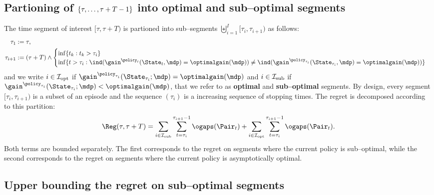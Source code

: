 \documentclass[preprint,cleveref,12pt]{colt2025}
\DeclarePairedDelimiter{\braces}{\{}{\}}	%
\DeclarePairedDelimiter{\parens}{(}{)}	%
\newcommand{\indic}[1]{\ind\parens{#1}}
\def\indicator{\indic}
\def\model{\mdp}
\def\optgain{\optimalgain} %
\newcommand{\strong}[1]{\textbf{#1}}
\begin{document}
    \subsection{Partioning of $\braces{\tau, \ldots, \tau+T-1}$ into optimal and sub--optimal segments}
    \label{appendix_coherence_partioning}

    The time segment of interest $[\tau, \tau+T)$ is partioned into sub--segments $\biguplus_{i=1}^I [\tau_i, \tau_{i+1})$ as follows:
        \vspace{-1em}
    \begin{equation}
    \notag
    \begin{split}
        \tau_1 & := \tau, 
        \\
        \tau_{i+1} & := 
        (\tau + T) 
        \wedge 
        \begin{cases}
            \inf \braces{t_k: t_k > \tau_i} 
            \\
            \inf \braces{t > \tau_i: \indicator{\gain^{\policy_t}(\State_t, \model) = \optgain(\model)} \ne \indicator{\gain^{\policy_{\tau_i}}(\State_{\tau_i}, \model) = \optgain(\model)}}
        \end{cases}
    \end{split}
    \end{equation}
    \noindent
    and we write $i \in \mathcal{I}_{\rm opt}$ if $\gain^{\policy_{\tau_i}}(\State_{\tau_i}; \model) = \optgain(\model)$ and $i \in \mathcal{I}_{\rm sub}$ if $\gain^{\policy_{\tau_i}}(\State_{\tau_i}; \model) < \optgain(\model)$, that we refer to as \strong{optimal} and \strong{sub--optimal} segments. 
    By design, every segment $[\tau_i, \tau_{i+1})$ is a subset of an episode and the sequence $(\tau_i)$ is a increasing sequence of stopping times. 
    The regret is decomposed according to this partition:
    \begin{equation}
    \label{equation_coherence_partioning}
        \Reg(\tau, \tau+T)
        = 
        \sum_{i \in \mathcal{I}_\mathrm{sub}} \sum_{t=\tau_i}^{\tau_{i+1}-1} \ogaps(\Pair_t)
        +
        \sum_{i \in \mathcal{I}_\mathrm{opt}} \sum_{t=\tau_i}^{\tau_{i+1}-1} \ogaps(\Pair_t)
        .
    \end{equation}
    Both terms are bounded separately.
    The first corresponds to the regret on segments where the current policy is sub--optimal, while the second corresponds to the regret on segments where the current policy is asymptotically optimal. 

    \subsection{Upper bounding the regret on sub--optimal segments}
    \label{appendix_coherence_suboptimal_segments}
\end{document}
